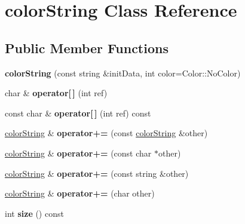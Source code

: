 \hypertarget{classcolorString}{
\section{colorString Class Reference}
\label{classcolorString}
}
\subsection*{Public Member Functions}
\begin{DoxyCompactItemize}
\item 
\hypertarget{classcolorString_a5cbb29382024da7f0dbf092e4d660fe3}{
{\bfseries colorString} (const string \&initData, int color=Color::NoColor)}
\label{classcolorString_a5cbb29382024da7f0dbf092e4d660fe3}

\item 
\hypertarget{classcolorString_acc3a1e5a8630251d6d9858ec680262fe}{
char \& {\bfseries operator\mbox{[}$\,$\mbox{]}} (int ref)}
\label{classcolorString_acc3a1e5a8630251d6d9858ec680262fe}

\item 
\hypertarget{classcolorString_a8f1a4ad5bfce67efbaaf569af72bd88a}{
const char \& {\bfseries operator\mbox{[}$\,$\mbox{]}} (int ref) const }
\label{classcolorString_a8f1a4ad5bfce67efbaaf569af72bd88a}

\item 
\hypertarget{classcolorString_a6c6b1cc3ebad1c7799b3c091e1418da2}{
\hyperlink{classcolorString}{colorString} \& {\bfseries operator+=} (const \hyperlink{classcolorString}{colorString} \&other)}
\label{classcolorString_a6c6b1cc3ebad1c7799b3c091e1418da2}

\item 
\hypertarget{classcolorString_a2613e0005ce01631a636ffb0d21efa33}{
\hyperlink{classcolorString}{colorString} \& {\bfseries operator+=} (const char $\ast$other)}
\label{classcolorString_a2613e0005ce01631a636ffb0d21efa33}

\item 
\hypertarget{classcolorString_ae2db7ada06c13c87cb90202f4737370b}{
\hyperlink{classcolorString}{colorString} \& {\bfseries operator+=} (const string \&other)}
\label{classcolorString_ae2db7ada06c13c87cb90202f4737370b}

\item 
\hypertarget{classcolorString_a60ac18154acc09e45fec2694487688ba}{
\hyperlink{classcolorString}{colorString} \& {\bfseries operator+=} (char other)}
\label{classcolorString_a60ac18154acc09e45fec2694487688ba}

\item 
\hypertarget{classcolorString_a2e086d75d17513bcc8c0f0a8f8d6c5a5}{
int {\bfseries size} () const }
\label{classcolorString_a2e086d75d17513bcc8c0f0a8f8d6c5a5}

\end{DoxyCompactItemize}
